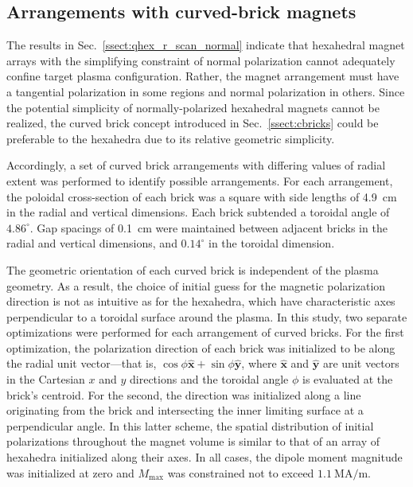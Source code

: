 \documentclass[11pt,onecolumn]{article}
\begin{document}
\subsection{Arrangements with curved-brick magnets}
\label{ssect:cbrick_r_scan_free}

The results in Sec.~\ref{ssect:qhex_r_scan_normal} indicate that hexahedral 
magnet arrays with the simplifying constraint of normal
polarization cannot adequately confine target plasma configuration.
Rather, the magnet arrangement must have a tangential polarization in some
regions and normal polarization in others.
Since the potential simplicity of normally-polarized hexahedral magnets
cannot be realized, the curved brick concept introduced in 
Sec.~\ref{ssect:cbricks} could be preferable to the hexahedra due to its 
relative geometric simplicity.

Accordingly, a set of curved brick arrangements with differing values of
radial extent was performed to identify possible arrangements. For each
arrangement, the poloidal cross-section of each brick was a square with side 
lengths of 4.9~cm in the radial and vertical dimensions. Each brick subtended
a toroidal angle of $4.86^\circ$. Gap spacings of 0.1~cm were maintained 
between adjacent bricks in the radial and vertical dimensions, and
$0.14^\circ$ in the toroidal dimension. 

The geometric orientation of each curved brick is independent of the
plasma geometry. As a result, the choice of initial guess for the magnetic
polarization direction is not as intuitive as for the hexahedra, which have
characteristic axes perpendicular to a toroidal surface around the plasma.
In this study, two separate optimizations were performed for each arrangement
of curved bricks. For the first optimization, the polarization direction of
each brick was initialized to be along the radial unit vector---that is,
$\cos\phi\hat{\mathbf{x}} + \sin\phi\hat{\mathbf{y}}$, where $\hat{\mathbf{x}}$
and $\hat{\mathbf{y}}$ are unit vectors in the Cartesian $x$ and $y$ directions
and the toroidal angle $\phi$ is evaluated at the brick's centroid.
For the second, the direction was initialized along a line originating from
the brick and intersecting the inner limiting surface at
a perpendicular angle. In this latter scheme, the spatial distribution 
of initial polarizations throughout the magnet volume is similar to that
of an array of hexahedra initialized along their axes.
In all cases, the dipole moment magnitude was initialized at zero and
$M_\text{max}$ was constrained not to exceed $1.1~\text{MA}/\text{m}$.
\end{document}
